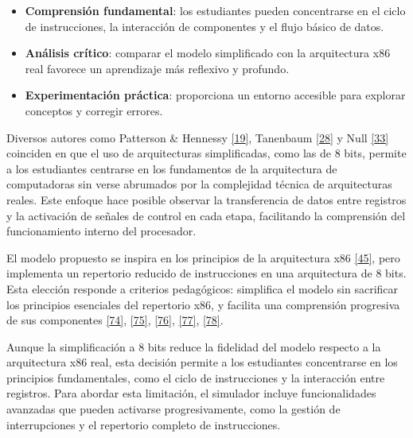 \documentclass[12pt,oneside]{templates/unerthesis}
\providecommand{\tightlist}{%
  \setlength{\itemsep}{0pt}\setlength{\parskip}{0pt}}
\begin{document}
\begin{itemize}
\tightlist
\item
  \textbf{Comprensión fundamental}: los estudiantes pueden concentrarse en el ciclo de instrucciones, la interacción de componentes y el flujo básico de datos.\\
\item
  \textbf{Análisis crítico}: comparar el modelo simplificado con la arquitectura x86 real favorece un aprendizaje más reflexivo y profundo.\\
\item
  \textbf{Experimentación práctica}: proporciona un entorno accesible para explorar conceptos y corregir errores.
\end{itemize}

Diversos autores como Patterson \& Hennessy \protect\hyperlink{ref-hennessy2017computer}{{[}19{]}}, Tanenbaum \protect\hyperlink{ref-tanenbaum_structured_2016}{{[}28{]}} y Null \protect\hyperlink{ref-null_essentials_2023}{{[}33{]}} coinciden en que el uso de arquitecturas simplificadas, como las de 8 bits, permite a los estudiantes centrarse en los fundamentos de la arquitectura de computadoras sin verse abrumados por la complejidad técnica de arquitecturas reales. Este enfoque hace posible observar la transferencia de datos entre registros y la activación de señales de control en cada etapa, facilitando la comprensión del funcionamiento interno del procesador.

El modelo propuesto se inspira en los principios de la arquitectura x86 \protect\hyperlink{ref-intel_microarchitecture_2021}{{[}45{]}}, pero implementa un repertorio reducido de instrucciones en una arquitectura de 8 bits. Esta elección responde a criterios pedagógicos: simplifica el modelo sin sacrificar los principios esenciales del repertorio x86, y facilita una comprensión progresiva de sus componentes \protect\hyperlink{ref-patt2019introduction}{{[}74{]}}, \protect\hyperlink{ref-majid1999design}{{[}75{]}}, \protect\hyperlink{ref-morlan_sap1_2021}{{[}76{]}}, \protect\hyperlink{ref-Guald_2015_thesis}{{[}77{]}}, \protect\hyperlink{ref-silber_tinycpu}{{[}78{]}}.

Aunque la simplificación a 8 bits reduce la fidelidad del modelo respecto a la arquitectura x86 real, esta decisión permite a los estudiantes concentrarse en los principios fundamentales, como el ciclo de instrucciones y la interacción entre registros. Para abordar esta limitación, el simulador incluye funcionalidades avanzadas que pueden activarse progresivamente, como la gestión de interrupciones y el repertorio completo de instrucciones.
\end{document}
